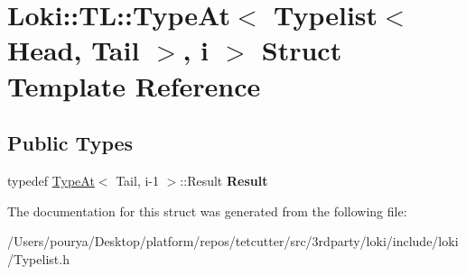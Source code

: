 \hypertarget{structLoki_1_1TL_1_1TypeAt_3_01Typelist_3_01Head_00_01Tail_01_4_00_01i_01_4}{}\section{Loki\+:\+:T\+L\+:\+:Type\+At$<$ Typelist$<$ Head, Tail $>$, i $>$ Struct Template Reference}
\label{structLoki_1_1TL_1_1TypeAt_3_01Typelist_3_01Head_00_01Tail_01_4_00_01i_01_4}
\subsection*{Public Types}
\begin{DoxyCompactItemize}
\item 
\hypertarget{structLoki_1_1TL_1_1TypeAt_3_01Typelist_3_01Head_00_01Tail_01_4_00_01i_01_4_aa0c736221268df5478683f0822ee2bb1}{}typedef \hyperlink{structLoki_1_1TL_1_1TypeAt}{Type\+At}$<$ Tail, i-\/1 $>$\+::Result {\bfseries Result}\label{structLoki_1_1TL_1_1TypeAt_3_01Typelist_3_01Head_00_01Tail_01_4_00_01i_01_4_aa0c736221268df5478683f0822ee2bb1}

\end{DoxyCompactItemize}


The documentation for this struct was generated from the following file\+:\begin{DoxyCompactItemize}
\item 
/\+Users/pourya/\+Desktop/platform/repos/tetcutter/src/3rdparty/loki/include/loki/Typelist.\+h\end{DoxyCompactItemize}
